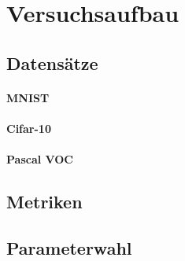\section{Versuchsaufbau}
\label{versuchsaufbau}

\subsection{Datensätze}
\label{datensaetze}

\paragraph{MNIST}
\label{MNIST}

\paragraph{Cifar-10}
\label{cifar_10}

\paragraph{Pascal VOC}
\label{pascal_voc}

\subsection{Metriken}
\label{metriken}

\subsection{Parameterwahl}
\label{parameterwahl}
